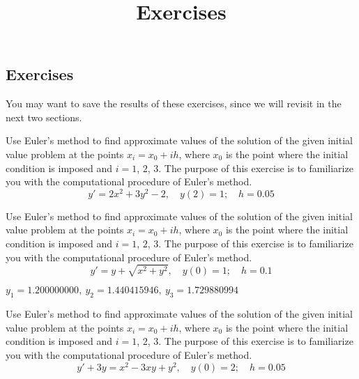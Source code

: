 \documentclass{ximera}
\title{Exercises} \license{CC BY-NC-SA 4.0}
\begin{document}
\begin{abstract}
\end{abstract}
\maketitle

\begin{onlineOnly}
\section*{Exercises}
\end{onlineOnly}



You may want to save the results of these
exercises, since we will revisit in the next two sections.


\begin{problem}\label{exer:3.1.1} Use Euler's method to find approximate values of the solution of the given initial value problem
at the points $x_i=x_0+ih$, where $x_0$ is the point where the
initial condition is imposed and $i=1$, $2$, $3$. The purpose of this exercise is to familiarize you with the computational procedure of Euler's method.
$$y'=2x^2+3y^2-2,\quad y(2)=1;\quad h=0.05$$
\end{problem}

\begin{problem}\label{exer:3.1.2} Use Euler's method to find approximate values of the solution of the given initial value problem
at the points $x_i=x_0+ih$, where $x_0$ is the point where the
initial condition is imposed and $i=1$, $2$, $3$. The purpose of this exercise is to familiarize you with the computational procedure of Euler's method.
$$y'=y+\sqrt{x^2+y^2},\quad y(0)=1;\quad h=0.1$$



\begin{solution}
    $y_1=1.200000000,\ y_2=1.440415946,\ y_3=1.729880994$
\end{solution}
\end{problem}

\begin{problem}\label{exer:3.1.3} Use Euler's method to find approximate values of the solution of the given initial value problem
at the points $x_i=x_0+ih$, where $x_0$ is the point where the
initial condition is imposed and $i=1$, $2$, $3$. The purpose of this exercise is to familiarize you with the computational procedure of Euler's method.
$$y'+3y=x^2-3xy+y^2,\quad y(0)=2;\quad h=0.05$$
\end{problem}
\end{document}

